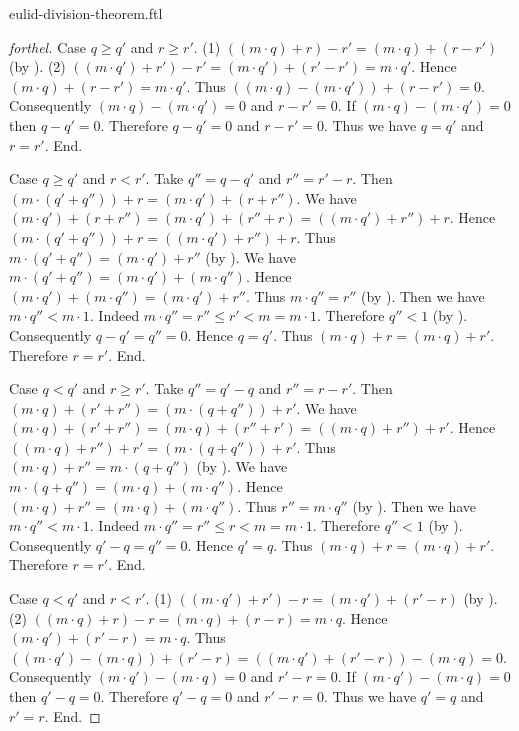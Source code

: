 \documentclass{naproche-library}
\begin{document}
\begin{smodule}[title=Euclid's Division Theorem]{eulid-division-theorem.ftl}
\begin{proof}[forthel]
  Case $q \geq q'$ and $r \geq r'$.
    (1) $((m \cdot q) + r) - r' = (m \cdot q) + (r - r')$ (by ).
    (2) $((m \cdot q') + r') - r'
      = (m \cdot q') + (r' - r')
      = m \cdot q'$.
    Hence $(m \cdot q) + (r - r') = m \cdot q'$.
    Thus $((m \cdot q) - (m \cdot q')) + (r - r') = 0$.
    Consequently $(m \cdot q) - (m \cdot q') = 0$ and $r - r' = 0$.
    If $(m \cdot q) - (m \cdot q') = 0$ then $q - q' = 0$.
    Therefore $q - q' = 0$ and $r - r' = 0$.
    Thus we have $q = q'$ and $r = r'$.
  End.

  Case $q \geq q'$ and $r < r'$.
    Take $q'' = q - q'$ and $r'' = r' - r$.
    Then $(m \cdot (q' + q'')) + r = (m \cdot q') + (r + r'')$.
    We have $(m \cdot q') + (r + r'')
      = (m \cdot q') + (r'' + r)
      = ((m \cdot q') + r'') + r$.
    Hence $(m \cdot (q' + q'')) + r = ((m \cdot q') + r'') + r$.
    Thus $m \cdot (q' + q'') = (m \cdot q') + r''$ (by ).
    We have $m \cdot (q' + q'') = (m \cdot q') + (m \cdot q'')$.
    Hence $(m \cdot q') + (m \cdot q'') = (m \cdot q') + r''$.
    Thus $m \cdot q'' = r''$ (by ).
    Then we have $m \cdot q'' < m \cdot 1$.
    Indeed $m \cdot q''
      = r''
      \leq r'
      < m
      = m \cdot 1$.
    Therefore $q'' < 1$ (by ).
    Consequently $q - q' = q'' = 0$.
    Hence $q = q'$.
    Thus $(m \cdot q) + r = (m \cdot q) + r'$.
    Therefore $r = r'$.
  End.

  Case $q < q'$ and $r \geq r'$.
    Take $q'' = q' - q$ and $r'' = r - r'$.
    Then $(m \cdot q) + (r' + r'') = (m \cdot (q + q'')) + r'$.
    We have $(m \cdot q) + (r' + r'')
      = (m \cdot q) + (r'' + r')
      = ((m \cdot q) + r'') + r'$.
    Hence $((m \cdot q) + r'') + r' = (m \cdot (q + q'')) + r'$.
    Thus $(m \cdot q) + r'' = m \cdot (q + q'')$ (by ).
    We have $m \cdot (q + q'') = (m \cdot q) + (m \cdot q'')$.
    Hence $(m \cdot q) + r'' = (m \cdot q) + (m \cdot q'')$.
    Thus $r'' = m \cdot q''$ (by ).
    Then we have $m \cdot q'' < m \cdot 1$.
    Indeed $m \cdot q''
      = r''
      \leq r
      < m
      = m \cdot 1$.
    Therefore $q'' < 1$ (by ).
    Consequently $q' - q = q'' = 0$.
    Hence $q' = q$.
    Thus $(m \cdot q) + r = (m \cdot q) + r'$.
    Therefore $r = r'$.
  End.

  Case $q < q'$ and $r < r'$.
    (1) $((m \cdot q') + r') - r = (m \cdot q') + (r' - r)$ (by ).
    (2) $((m \cdot q) + r) - r
      = (m \cdot q) + (r - r)
      = m \cdot q$.
    Hence $(m \cdot q') + (r' - r) = m \cdot q$.
    Thus $((m \cdot q') - (m \cdot q)) + (r' - r)
      = ((m \cdot q') + (r' - r)) - (m \cdot q)
      = 0$.
    Consequently $(m \cdot q') - (m \cdot q) = 0$ and $r' - r = 0$.
    If $(m \cdot q') - (m \cdot q) = 0$ then $q' - q = 0$.
    Therefore $q' - q = 0$ and $r' - r = 0$.
    Thus we have $q' = q$ and $r' = r$.
  End.
\end{proof}
\end{smodule}
\end{document}
